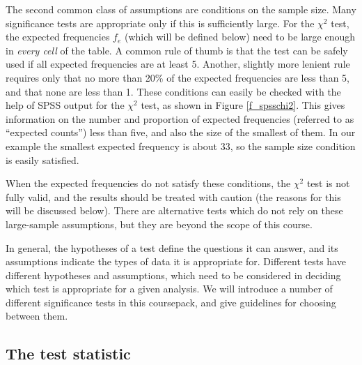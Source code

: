 \label{p_chi2_fesize}
The second common class of assumptions are conditions on the sample size. Many significance tests are appropriate
only if this is sufficiently large. For the $\chi^{2}$ test,
the expected frequencies $f_{e}$ (which will be defined below) need
to be large enough in \emph{every cell} of the table. A common rule of
thumb is that the test can be safely used if all expected frequencies
are at least 5. Another, slightly more lenient rule requires only that
no more than 20\% of the expected frequencies are less than 5, and that
none are less than 1. These conditions can easily be checked with the
help of SPSS output for the $\chi^{2}$ test, as shown in Figure
\ref{f_spsschi2}. This gives information on the number and proportion of
expected frequencies (referred to as ``expected counts'') less than
five, and also the size of the smallest of them. In our example the
smallest expected frequency is about 33, so
the sample size condition is easily satisfied.

When the expected frequencies do not satisfy these conditions, the
$\chi^{2}$ test is not fully valid, and the results should be treated
with caution (the reasons for this will be discussed below). There are
alternative tests which do not rely on these large-sample assumptions,
but they are beyond the scope of this course.

In general, the hypotheses of a test define the questions it can answer,
and its assumptions indicate the types of data it is appropriate for.
Different tests have different hypotheses and assumptions, which need to
be considered in deciding which test is appropriate for a given
analysis. We will introduce a number of different significance tests in
this coursepack, and give guidelines for choosing between them.

\subsection{The test statistic}
\label{ss_tables_chi2test_stat}


